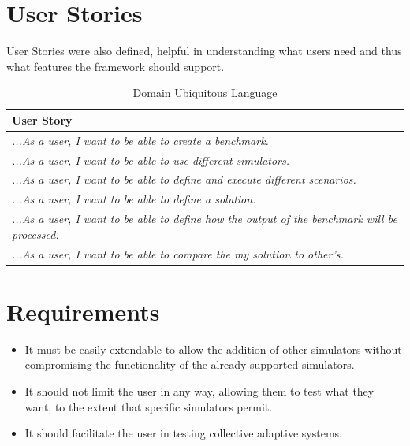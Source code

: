 \documentclass[12pt,a4paper,openright,twoside]{book}
\begin{document}
\section{User Stories}

User Stories were also defined, helpful in understanding what users need and thus what features the framework should support.


\begin{table}[H]
  \centering
  \begin{tabular}{|p{\textwidth}|}
  \toprule
  \textbf{User Story} \\
  \midrule                                                                                                                                                              
  \textit{...As a user, I want to be able to create a benchmark.} \\ \hline
  \textit{...As a user, I want to be able to use different simulators.} \\ \hline
  \textit{...As a user, I want to be able to define and execute different scenarios.} \\ \hline
  \textit{...As a user, I want to be able to define a solution.} \\ \hline
  \textit{...As a user, I want to be able to define how the output of the benchmark will be processed.} \\ \hline
  \textit{...As a user, I want to be able to compare the my solution to other's.} \\ \hline
  \end{tabular}
  \caption{Domain Ubiquitous Language}
\end{table}

\section{Requirements}

\begin{itemize}
  \item It must be easily extendable to allow the addition of other simulators without compromising the functionality of the already supported simulators.
  \item It should not limit the user in any way, allowing them to test what they want, to the extent that specific simulators permit.
  \item It should facilitate the user in testing collective adaptive systems.
\end{itemize}
\end{document}
